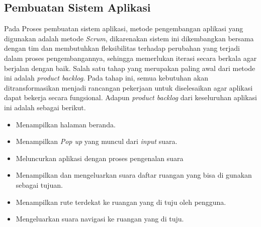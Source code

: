 \subsection{Pembuatan Sistem Aplikasi}
Pada Proses pembuatan sistem aplikasi, metode pengembangan aplikasi yang digunakan adalah metode \textit{Scrum}, dikarenakan sistem ini dikembangkan bersama dengan tim dan membutuhkan fleksibilitas terhadap perubahan yang terjadi dalam proses pengembangannya, sehingga memerlukan iterasi secara berkala agar berjalan dengan baik. Salah satu tahap yang merupakan paling awal dari metode ini adalah \textit{product backlog}. Pada tahap ini, semua kebutuhan akan ditransformasikan menjadi rancangan pekerjaan untuk diselesaikan agar aplikasi dapat bekerja secara fungsional. Adapun \textit{product backlog} dari keseluruhan aplikasi ini adalah sebagai berikut.

\begin{itemize}
\item Menampilkan halaman beranda.

\item Menampilkan \textit{Pop up} yang muncul dari \textit{input} suara.

\item Meluncurkan aplikasi dengan proses pengenalan suara

\item Menampilkan dan mengeluarkan suara daftar ruangan yang bisa di gunakan sebagai tujuan.

\item Menampilkan rute terdekat ke ruangan yang di tuju oleh pengguna.

\item Mengeluarkan suara navigasi ke ruangan yang di tuju.

\end{itemize}

